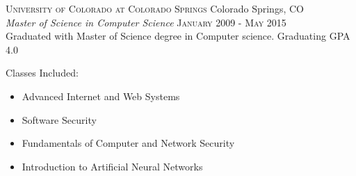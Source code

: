 
\textsc{University of Colorado at Colorado Springs} \hfill Colorado Springs, CO\\
\emph{Master of Science in Computer Science} \hfill \textsc{January 2009} - \textsc{May 2015}\\
Graduated with Master of Science degree in Computer science.  Graduating GPA 4.0

Classes Included:
\begin{itemize}
\item Advanced Internet and Web Systems
\item Software Security
\item Fundamentals of Computer and Network Security
\item Introduction to Artificial Neural Networks
\end{itemize}
